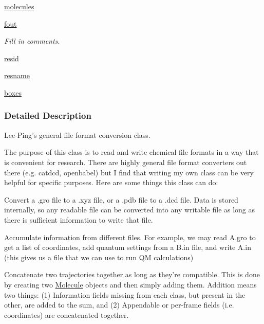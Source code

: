 \begin{DoxyCompactItemize}
\hyperlink{classforcebalance_1_1molecule_1_1Molecule_ac0a283e8dd0d63a852311ccdc904e31f}{molecules}
\item 
\hyperlink{classforcebalance_1_1molecule_1_1Molecule_a7887451529cc2b396240b6e4ebfcc2de}{fout}
\begin{DoxyCompactList}\small\item\em \-Fill in comments. \end{DoxyCompactList}\item 
\hyperlink{classforcebalance_1_1molecule_1_1Molecule_afcd4c8e1671af626d0267a243e69530d}{resid}
\item 
\hyperlink{classforcebalance_1_1molecule_1_1Molecule_a4aebc6ada9bda74a6740568d4f3658eb}{resname}
\item 
\hyperlink{classforcebalance_1_1molecule_1_1Molecule_ac84c67d37f00c0f65e6fb6126e19f9bb}{boxes}
\end{DoxyCompactItemize}


\subsubsection{\-Detailed \-Description}
\-Lee-\/\-Ping's general file format conversion class. 

\-The purpose of this class is to read and write chemical file formats in a way that is convenient for research. \-There are highly general file format converters out there (e.\-g. catdcd, openbabel) but \-I find that writing my own class can be very helpful for specific purposes. \-Here are some things this class can do\-:


\begin{DoxyItemize}
\item \-Convert a .gro file to a .xyz file, or a .pdb file to a .dcd file. \-Data is stored internally, so any readable file can be converted into any writable file as long as there is sufficient information to write that file.
\end{DoxyItemize}


\begin{DoxyItemize}
\item \-Accumulate information from different files. \-For example, we may read \-A.\-gro to get a list of coordinates, add quantum settings from a \-B.\-in file, and write \-A.\-in (this gives us a file that we can use to run \-Q\-M calculations)
\end{DoxyItemize}


\begin{DoxyItemize}
\item \-Concatenate two trajectories together as long as they're compatible. \-This is done by creating two \hyperlink{classforcebalance_1_1molecule_1_1Molecule}{\-Molecule} objects and then simply adding them. \-Addition means two things\-: (1) \-Information fields missing from each class, but present in the other, are added to the sum, and (2) \-Appendable or per-\/frame fields (i.\-e. coordinates) are concatenated together.
\end{DoxyItemize}


